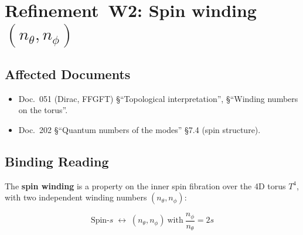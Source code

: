 \section{\texorpdfstring{Refinement~W2: Spin winding $(n_\theta, n_\phi)$}{Refinement W2: Spin winding}}

\subsection*{Affected Documents}

\begin{itemize}
  \item Doc.~051 (Dirac, FFGFT) §\enquote{Topological interpretation},
        §\enquote{Winding numbers on the torus}.
  \item Doc.~202 §\enquote{Quantum numbers of the modes} \S 7.4
        (spin structure).
\end{itemize}

\subsection*{Binding Reading}

The \textbf{spin winding} is a property on the inner spin fibration
over the 4D torus $T^4$, with two independent winding numbers
$(n_\theta, n_\phi)$:

\begin{equation}
  \text{Spin-}s \;\longleftrightarrow\;
  (n_\theta, n_\phi)\ \text{with}\ \frac{n_\phi}{n_\theta} = 2s
  \tag{210.2}
\end{equation}

\begin{center}
{\footnotesize
{}
}
\end{center}


